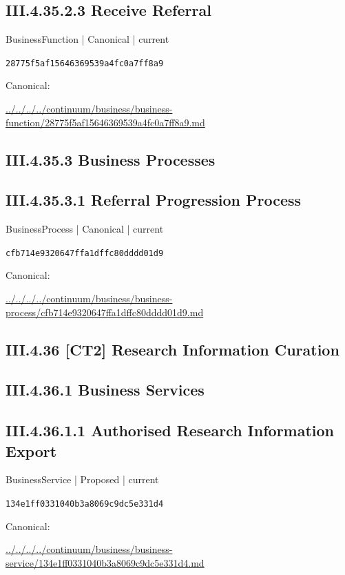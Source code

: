\documentclass[10pt,a4paper]{article}
\begin{document}
\subsection*{III.4.35.2.3 Receive Referral}
{\small BusinessFunction | Canonical | current}\par
\texttt{28775f5af15646369539a4fc0a7ff8a9}\par
Canonical: \par
{\footnotesize\url{../../../../continuum/business/business-function/28775f5af15646369539a4fc0a7ff8a9.md}}\par
\subsection*{III.4.35.3 Business Processes}
\subsection*{III.4.35.3.1 Referral Progression Process}
{\small BusinessProcess | Canonical | current}\par
\texttt{cfb714e9320647ffa1dffc80dddd01d9}\par
Canonical: \par
{\footnotesize\url{../../../../continuum/business/business-process/cfb714e9320647ffa1dffc80dddd01d9.md}}\par
\subsection*{III.4.36 [CT2] Research Information Curation}
\subsection*{III.4.36.1 Business Services}
\subsection*{III.4.36.1.1 Authorised Research Information Export}
{\small BusinessService | Proposed | current}\par
\texttt{134e1ff0331040b3a8069c9dc5e331d4}\par
Canonical: \par
{\footnotesize\url{../../../../continuum/business/business-service/134e1ff0331040b3a8069c9dc5e331d4.md}}\par
\end{document}
